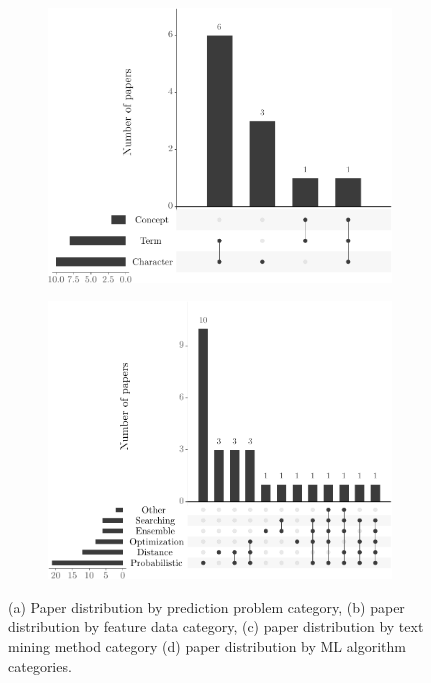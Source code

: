 \begin{figure}[!htp]
\begin{subfigure}{.49\textwidth}
    \includegraphics[width=\textwidth]{figures/distribution-by-tm-method-category-in-ups.pdf}
    \caption{}
    \label{fig:distribution-by-tm-method-category}
  \end{subfigure}\hfill
  \begin{subfigure}{.49\textwidth}
    \centering
    \includegraphics[width=\textwidth]{figures/distribution-by-ml-algorithm-category-in-ups.pdf}
    \caption{}
    \label{fig:distribution-by-ml-algorithm-category} 
  \end{subfigure}
  \caption{(a) Paper distribution by prediction problem category, (b) paper distribution by feature data category, (c) paper distribution by text mining method category (d) paper distribution by ML algorithm categories.}
  \label{fig:rq3_4_6_7_charts}
\end{figure}

